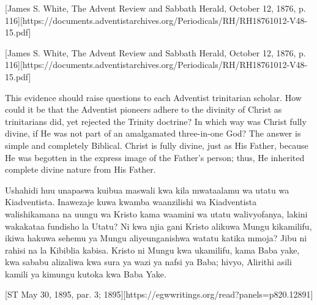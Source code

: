 [James S. White, The Advent Review and Sabbath Herald, October 12, 1876, p. 116][https://documents.adventistarchives.org/Periodicals/RH/RH18761012-V48-15.pdf]


[James S. White, The Advent Review and Sabbath Herald, October 12, 1876, p. 116][https://documents.adventistarchives.org/Periodicals/RH/RH18761012-V48-15.pdf]


This evidence should raise questions to each Adventist trinitarian scholar. How could it be that the Adventist pioneers adhere to the divinity of Christ as trinitarians did, yet rejected the Trinity doctrine? In which way was Christ fully divine, if He was not part of an amalgamated three-in-one God? The answer is simple and completely Biblical. Christ is fully divine, just as His Father, because He was begotten in the express image of the Father’s person; thus, He inherited complete divine nature from His Father.


Ushahidi huu unapaswa kuibua maswali kwa kila mwataalamu wa utatu wa Kiadventista. Inawezaje kuwa kwamba waanzilishi wa Kiadventista walishikamana na uungu wa Kristo kama waamini wa utatu walivyofanya, lakini wakakataa fundisho la Utatu? Ni kwa njia gani Kristo alikuwa Mungu kikamilifu, ikiwa hakuwa sehemu ya Mungu aliyeunganishwa watatu katika mmoja? Jibu ni rahisi na la Kibiblia kabisa. Kristo ni Mungu kwa ukamilifu, kama Baba yake, kwa sababu alizaliwa kwa sura ya wazi ya nafsi ya Baba; hivyo, Alirithi asili kamili ya kimungu kutoka kwa Baba Yake.


[ST May 30, 1895, par. 3; 1895][https://egwwritings.org/read?panels=p820.12891]


